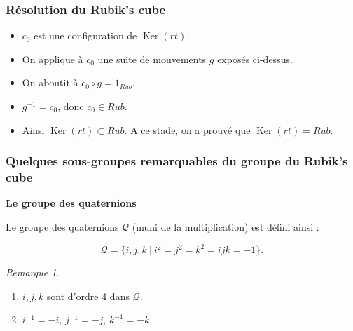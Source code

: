\documentclass[10pt,notheorems]{beamer}
\theoremstyle{plain}
\theoremstyle{definition}
\theoremstyle{plain}
\theoremstyle{plain}
\theoremstyle{plain}
\theoremstyle{remark}
\newtheorem{remark}{Remarque}
\begin{document}
\begin{frame}
  \frametitle{Résolution du Rubik's cube}
  \begin{itemize}
    \item $c_0$ est une configuration de $\operatorname{Ker}(rt)$.
    \item On applique à $c_0$ une suite de mouvements $g$ exposés ci-dessus.
    \item On aboutit à $c_0 \circ g = 1 _{Rub}$.
    \item $g ^{-1} = c_0$, donc $c_0 \in Rub$.
    \item Ainsi $\operatorname{Ker}(rt) \subset Rub$. A ce stade, on a prouvé que $\operatorname{Ker}(rt) = Rub$.
  \end{itemize}
\end{frame}

\begin{frame}
  \frametitle{Quelques sous-groupes remarquables du groupe du Rubik's cube}
  \textbf{Le groupe des quaternions}

  Le groupe des quaternions $\mathcal{Q}$ (muni de la multiplication) est défini ainsi :

  $$ \mathcal{Q} = \{ i,j,k \ | \ i ^2 = j ^2 = k ^2 = ijk = -1  \} .$$

\begin{remark}
  \
  \begin{enumerate}
    \item $i,j,k$ sont d'ordre 4 dans $\mathcal{Q}$.
    \item $i ^{-1} = -i$, $j ^{-1} = -j$, $k ^{-1} = -k$.
  \end{enumerate}
\end{remark}
\end{frame}
\end{document}

